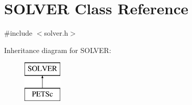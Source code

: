 \hypertarget{class_s_o_l_v_e_r}{}\section{S\+O\+L\+V\+ER Class Reference}
\label{class_s_o_l_v_e_r}


{\ttfamily \#include $<$solver.\+h$>$}

Inheritance diagram for S\+O\+L\+V\+ER\+:\begin{figure}[H]
\begin{center}
\leavevmode
\includegraphics[height=2.000000cm]{d7/d21/class_s_o_l_v_e_r}
\end{center}
\end{figure}
